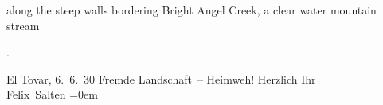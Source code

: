 \begin{ledgroupsized}[t]{13cm}
{{\begin{otherlanguage}{english}
                        along the steep walls bordering Bright
                           Angel Creek, a clear water mountain stream\end{otherlanguage}.}}\pend
           \pstart
           \raggedleft{}El Tovar, 6. 6. 30\pend
           \pstart
           Fremde Landschaft – Heimweh!\pend
           \pstart
           Herzlich Ihr {\\[\baselineskip]}\spacefill\mbox{Felix Salten}\pend
           \leftskip=0em{}
         
         \endnumbering{}\end{ledgroupsized}  \newcommand{\dateiname}{L03591}\newcommand{\titel}{Felix Salten an Arthur Schnitzler, 6. 6. 1930}\newcommand{\editorInnen}{Martin Anton Müller und Laura Untner}
      
